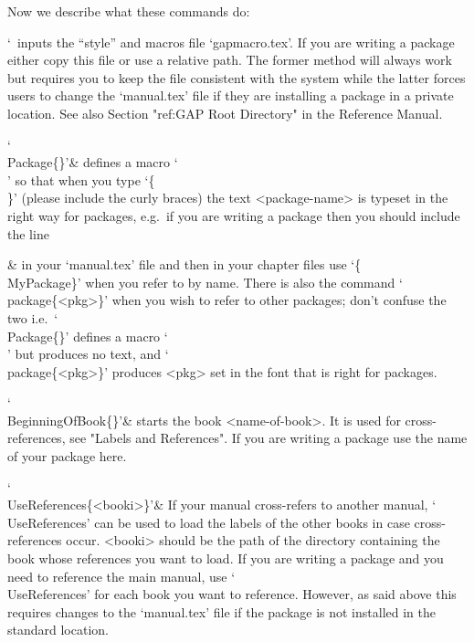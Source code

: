 Now we describe what these commands do:

\beginitems

`\
inputs the {\GAP} ``style'' and macros file `gapmacro.tex'.  If  you  are
writing a {\GAP} package either copy this file or use  a  relative  path.
The former method will always work but requires  you  to  keep  the  file
consistent with the system while the latter forces users  to  change  the
`manual.tex' file if they are installing a package in a private location.
See also Section "ref:GAP Root Directory" in the Reference Manual.

\indextt{\\Package}
`\\Package\{<package-name>\}'&
defines   a   macro   `\\<package-name>'   so   that   when   you    type
`\{\\<package-name>\}'  (please  include  the  curly  braces)  the   text
<package-name> is typeset in the right way for {\GAP}  packages,  e.g.~if
you are writing a package \package{MyPackage} then you should include the
line


  &
in  your  `manual.tex'  file  and  then  in  your   chapter   files   use
`\{\\MyPackage\}' when you refer to \package{MyPackage} by name. There is
also the command `\\package\{<pkg>\}' when you wish  to  refer  to  other
{\GAP} packages; don't confuse the two i.e.~`\\Package\{<package-name>\}'
defines  a  macro  `\\<package-name>'   but   produces   no   text,   and
`\\package\{<pkg>\}' produces <pkg> set in the font  that  is  right  for
{\GAP} packages.

\indextt{\\BeginningOfBook}
`\\BeginningOfBook\{<name-of-book>\}'&
starts the book <name-of-book>. It  is  used  for  cross-references,  see
"Labels and References". If you are writing a {\GAP} package use the name
of your package here.

\indextt{\\UseReferences}\indextt{\\UseGapDocReferences}
`\\UseReferences\{<booki>\}'&
If your manual cross-refers to another manual, `\\UseReferences'  can  be
used to load the labels of  the  other  books  in  case  cross-references
occur. <booki> should be the path of the directory  containing  the  book
whose references you want to load. If you are writing  a  {\GAP}  package
and you need to reference the main {\GAP} manual,  use  `\\UseReferences'
for each book you want to reference. However, as said above this requires
changes to the `manual.tex' file if the package is not installed  in  the
standard location.

